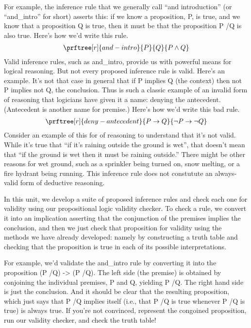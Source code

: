 \documentclass[letterpaper,10pt,english]{sphinxmanual}
\begin{document}
For example, the inference rule that we generally call “and
introduction” (or “and\_intro” for short) asserts this: if we know a
proposition, P, is true, and we know that a proposition Q is true,
then it must be that the proposition P /Q is also true. Here’s how
we’d write this rule.
\begin{equation*}
\begin{split}\prftree[r]{and-intro}{P}{Q}{P \land Q}\end{split}
\end{equation*}
Valid inference rules, such as and\_intro, provide us with powerful
means for logical reasoning. But not every proposed inference rule is
valid. Here’s an example. It’s not that case in general that if P
implies Q (the context) then not P implies not Q, the conclusion.
Thus is such a classic example of an invalid form of reasoning that
logicians have given it a name: denying the antecedent. (Antecedent is
another name for premise.) Here’s how we’d write this bad rule.
\begin{equation*}
\begin{split}\prftree[r]{deny-antecedent}{P \rightarrow Q}{{\neg P} \rightarrow {\neg Q}}\end{split}
\end{equation*}
Consider an example of this for of reasoning to understand that it’s
not valid. While it’s true that “if it’s raining outside the ground is
wet”, that doesn’t mean that “if the ground is wet then it must be
raining outside.” There might be other reasons for wet ground, such as
a sprinkler being turned on, snow melting, or a fire hydrant being
running. This inference rule does not constutute an always-valid form
of deductive reasoning.

In this unit, we develop a suite of proposed inference rules and check
each one for validity using our propositional logic validity checker.
To check a rule, we convert it into an implication asserting that the
conjunction of the premises implies the conclusion, and then we just
check that proposition for validity using the methods we have already
developed: namely by constructing a truth table and checking that the
proposition is true in each of its possible interpretations.

For example, we’d validate the and\_intro rule by converting it into
the proposition (P /Q) -\textgreater{} (P /Q). The left side (the premise) is
obtained by conjoining the individual premises, P and Q, yielding P
/Q. The right hand side is just the conclusion. And it should be
clear that the resulting proposition, which just says that P /Q
implies itself (i.e., that P /Q is true whenever P /Q is true) is
always true. If you’re not convinced, represent the congoined
proposition, run our validity checker, and check the truth table!
\end{document}
